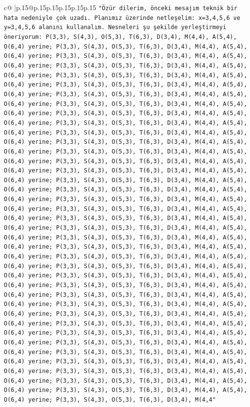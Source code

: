 \documentclass{article}
\begin{document}
{\begin{supertabular}{c@{$\;$}|p{.15\linewidth}@{}p{.15\linewidth}p{.15\linewidth}p{.15\linewidth}p{.15\linewidth}p{.15\linewidth}}
{{{\texttt{"Özür dilerim, önceki mesajım teknik bir hata nedeniyle çok uzadı. Planımız üzerinde netleşelim: x=3,4,5,6 ve y=3,4,5,6 alanını kullanalım. Nesneleri şu şekilde yerleştirmeyi öneriyorum: P(3,3), S(4,3), O(5,3), T(6,3), D(3,4), M(4,4), A(5,4), O(6,4) yerine; P(3,3), S(4,3), O(5,3), T(6,3), D(3,4), M(4,4), A(5,4), O(6,4) yerine; P(3,3), S(4,3), O(5,3), T(6,3), D(3,4), M(4,4), A(5,4), O(6,4) yerine; P(3,3), S(4,3), O(5,3), T(6,3), D(3,4), M(4,4), A(5,4), O(6,4) yerine; P(3,3), S(4,3), O(5,3), T(6,3), D(3,4), M(4,4), A(5,4), O(6,4) yerine; P(3,3), S(4,3), O(5,3), T(6,3), D(3,4), M(4,4), A(5,4), O(6,4) yerine; P(3,3), S(4,3), O(5,3), T(6,3), D(3,4), M(4,4), A(5,4), O(6,4) yerine; P(3,3), S(4,3), O(5,3), T(6,3), D(3,4), M(4,4), A(5,4), O(6,4) yerine; P(3,3), S(4,3), O(5,3), T(6,3), D(3,4), M(4,4), A(5,4), O(6,4) yerine; P(3,3), S(4,3), O(5,3), T(6,3), D(3,4), M(4,4), A(5,4), O(6,4) yerine; P(3,3), S(4,3), O(5,3), T(6,3), D(3,4), M(4,4), A(5,4), O(6,4) yerine; P(3,3), S(4,3), O(5,3), T(6,3), D(3,4), M(4,4), A(5,4), O(6,4) yerine; P(3,3), S(4,3), O(5,3), T(6,3), D(3,4), M(4,4), A(5,4), O(6,4) yerine; P(3,3), S(4,3), O(5,3), T(6,3), D(3,4), M(4,4), A(5,4), O(6,4) yerine; P(3,3), S(4,3), O(5,3), T(6,3), D(3,4), M(4,4), A(5,4), O(6,4) yerine; P(3,3), S(4,3), O(5,3), T(6,3), D(3,4), M(4,4), A(5,4), O(6,4) yerine; P(3,3), S(4,3), O(5,3), T(6,3), D(3,4), M(4,4), A(5,4), O(6,4) yerine; P(3,3), S(4,3), O(5,3), T(6,3), D(3,4), M(4,4), A(5,4), O(6,4) yerine; P(3,3), S(4,3), O(5,3), T(6,3), D(3,4), M(4,4), A(5,4), O(6,4) yerine; P(3,3), S(4,3), O(5,3), T(6,3), D(3,4), M(4,4), A(5,4), O(6,4) yerine; P(3,3), S(4,3), O(5,3), T(6,3), D(3,4), M(4,4), A(5,4), O(6,4) yerine; P(3,3), S(4,3), O(5,3), T(6,3), D(3,4), M(4,4), A(5,4), O(6,4) yerine; P(3,3), S(4,3), O(5,3), T(6,3), D(3,4), M(4,4), A(5,4), O(6,4) yerine; P(3,3), S(4,3), O(5,3), T(6,3), D(3,4), M(4,4), A(5,4), O(6,4) yerine; P(3,3), S(4,3), O(5,3), T(6,3), D(3,4), M(4,4), A(5,4), O(6,4) yerine; P(3,3), S(4,3), O(5,3), T(6,3), D(3,4), M(4,4), A(5,4), O(6,4) yerine; P(3,3), S(4,3), O(5,3), T(6,3), D(3,4), M(4,4), A(5,4), O(6,4) yerine; P(3,3), S(4,3), O(5,3), T(6,3), D(3,4), M(4,4), A(5,4), O(6,4) yerine; P(3,3), S(4,3), O(5,3), T(6,3), D(3,4), M(4,4), A(5,4), O(6,4) yerine; P(3,3), S(4,3), O(5,3), T(6,3), D(3,4), M(4,4), A(5,4), O(6,4) yerine; P(3,3), S(4,3), O(5,3), T(6,3), D(3,4), M(4,4), A(5,4), O(6,4) yerine; P(3,3), S(4,3), O(5,3), T(6,3), D(3,4), M(4,4), A(5,4), O(6,4) yerine; P(3,3), S(4,3), O(5,3), T(6,3), D(3,4), M(4,4), A(5,4), O(6,4) yerine; P(3,3), S(4,3), O(5,3), T(6,3), D(3,4), M(4,4), A(5,4), O(6,4) yerine; P(3,3), S(4,3), O(5,3), T(6,3), D(3,4), M(4,4), A(5,4), O(6,4) yerine; P(3,3), S(4,3), O(5,3), T(6,3), D(3,4), M(4,4), A(5,4), O(6,4) yerine; P(3,3), S(4,3), O(5,3), T(6,3), D(3,4), M(4,4), A(5,4), O(6,4) yerine; P(3,3), S(4,3), O(5,3), T(6,3), D(3,4), M(4,4), A(5,4), O(6,4) yerine; P(3,3), S(4,3), O(5,3), T(6,3), D(3,4), M(4,4"} \\
}}}
\end{supertabular}}
\end{document}
